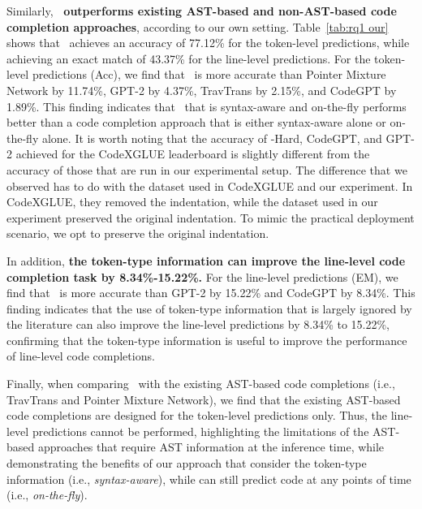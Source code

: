 Similarly, \textbf{\our~outperforms existing AST-based and non-AST-based code completion approaches}, according to our own setting.
Table~\ref{tab:rq1 our} shows that \our~achieves an accuracy of 77.12\% for the token-level predictions, while achieving an exact match of 43.37\% for the line-level predictions.
For the token-level predictions (Acc), we find that \our~is more accurate than Pointer Mixture Network by 11.74\%, GPT-2 by 4.37\%, TravTrans by 2.15\%, and CodeGPT by 1.89\%. 
This finding indicates that \our~that is syntax-aware and on-the-fly performs better than a code completion approach that is either syntax-aware alone or on-the-fly alone.
It is worth noting that the accuracy of \our-Hard, CodeGPT, and GPT-2 achieved for the CodeXGLUE leaderboard is slightly different from the accuracy of those that are run in our experimental setup.
The difference that we observed has to do with the dataset used in CodeXGLUE and our experiment.
In CodeXGLUE, they removed the indentation, while the dataset used in our experiment preserved the original indentation.
To mimic the practical deployment scenario, we opt to preserve the original indentation.


In addition, \textbf{the token-type information can improve the line-level code completion task by 8.34\%-15.22\%.}
For the line-level predictions (EM), we find that \our~is more accurate than GPT-2 by 15.22\% and CodeGPT by 8.34\%. 
This finding indicates that the use of token-type information that is largely ignored by the literature can also improve the line-level predictions by 8.34\% to 15.22\%, confirming that the token-type information is useful to improve the performance of line-level code completions.

Finally, when comparing \our~with the existing AST-based code completions (i.e., TravTrans and Pointer Mixture Network), we find that the existing AST-based code completions are designed for the token-level predictions only.
Thus, the line-level predictions cannot be performed, highlighting the limitations of the AST-based approaches that require AST information at the inference time, while demonstrating the benefits of our approach that consider the token-type information (i.e., \emph{syntax-aware}), while can still predict code at any points of time (i.e., \emph{on-the-fly}).




